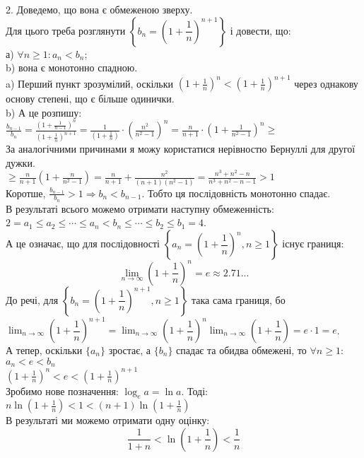 \documentclass[a4paper, 14pt]{article}
\def\huge{\displaystyle}
\theoremstyle{theoremdd}
\theoremstyle{theoremdd}
\theoremstyle{theoremdd}
\theoremstyle{theoremdd}
\theoremstyle{theoremdd}
\theoremstyle{theoremdd}
\theoremstyle{theoremdd}
\theoremstyle{theoremdd}
\begin{document}
	2. Доведемо, що вона є обмеженою зверху.\\
	Для цього треба розглянути $\left\{ b_n = \left( 1 + \dfrac{1}{n} \right)^{n+1} \right\}$ і довести, що:\\
	а) $\forall n \geq 1: a_n < b_n$;\\
	b) вона є монотонно спадною.
	\bigskip \\
	a) Перший пункт зрозумілий, оскільки $\displaystyle \left(1+\frac{1}{n} \right)^n < \left(1+\frac{1}{n} \right)^{n+1}$ через однакову основу степені, що є більше одинички.\\
	b) А це розпишу:\\
	$\displaystyle \frac{b_{n-1}}{b_n} = \frac{\displaystyle \left(1+\frac{1}{n-1} \right)^{n}}{\displaystyle \left(1+\frac{1}{n} \right)^{n+1}} = \frac{1}{\displaystyle \left(1+\frac{1}{n}\right)} \cdot \left(\frac{n^2}{n^2-1}\right)^n = \frac{n}{n+1} \cdot \left(1+\frac{1}{n^2-1} \right)^n \boxed{\geq}$\\
	За аналогічними причинами я можу користатися нерівностю Бернуллі для другої дужки.\\
	$\displaystyle \boxed{\geq} \frac{n}{n+1} \left(1+\frac{n}{n^2-1}\right) = \frac{n}{n+1} + \frac{n^2}{(n+1)(n^2-1)} = \frac{n^3+n^2-n}{n^3+n^2-n-1} > 1$\\
	Коротше, $\displaystyle \frac{b_{n-1}}{b_n} > 1 \Rightarrow b_n < b_{n-1}$. Тобто ця послідовність монотонно спадає.\\
	В результаті всього можемо отримати наступну обмеженність:\\
	$2=a_1 \leq a_2 \leq \cdots \leq a_n < b_n \leq \cdots \leq b_2 \leq b_1 = 4$.\\
	А це означає, що для послідовності $\left\{a_n = \left(1 + \dfrac{1}{n} \right)^n, n \geq 1 \right\}$ існує границя:
	$$\huge \lim_{n \to \infty}\left(1+\frac{1}{n} \right)^n = e \approx 2.71...$$
	До речі, для $\left\{b_n = \left( 1 + \dfrac{1}{n} \right)^{n+1}, n \geq 1 \right\}$ така сама границя, бо \\ $\huge\lim_{n \to \infty} \left( 1 + \dfrac{1}{n} \right)^{n+1} = \lim_{n \to \infty} \left( 1 + \dfrac{1}{n} \right)^n \lim_{n \to \infty} \left(1 + \dfrac{1}{n} \right) = e \cdot 1 = e$.
	\bigskip \\	
	А тепер, оскільки $\{a_n \}$ зростає, а $\{b_n \}$ спадає та обидва обмежені, то $\forall n \geq 1:$\\
	$a_n<e<b_n$\\
	$\displaystyle \left(1+\frac{1}{n} \right)^n < e < \left(1+\frac{1}{n} \right)^{n+1}$\\
	Зробимо нове позначення: $\log_{e} a =\ln a$. Тоді:\\
	$\displaystyle n \ln \left(1+\frac{1}{n} \right) < 1 < (n+1) \ln \left(1+\frac{1}{n} \right)$\\
	В результаті ми можемо отримати одну оцінку:
	 $$\frac{1}{1+n} < \ln (1+\frac{1}{n}) < \frac{1}{n}$$
	
\end{document}
